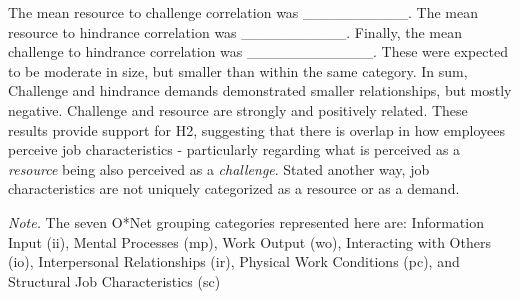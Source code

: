 \documentclass[
  english,
  man]{apa6}
\newenvironment{lltable}{\begin{landscape}\begin{center}\begin{ThreePartTable}}{\end{ThreePartTable}\end{center}\end{landscape}}
\begin{document}
The mean resource to challenge correlation was \_\_\_\_\_\_\_\_\_\_. The mean resource to hindrance correlation was \_\_\_\_\_\_\_\_\_\_. Finally, the mean challenge to hindrance correlation was \_\_\_\_\_\_\_\_\_\_\_\_. These were expected to be moderate in size, but smaller than within the same category. In sum, Challenge and hindrance demands demonstrated smaller relationships, but mostly negative. Challenge and resource are strongly and positively related. These results provide support for H2, suggesting that there is overlap in how employees perceive job characteristics - particularly regarding what is perceived as a \emph{resource} being also perceived as a \emph{challenge}. Stated another way, job characteristics are not uniquely categorized as a resource or as a demand.

\begin{lltable}

\begin{TableNotes}[para]
\normalsize{\textit{Note.} The seven O*Net grouping categories represented here are: Information Input (ii), Mental Processes (mp), Work Output (wo), Interacting with Others (io), Interpersonal Relationships (ir), Physical Work Conditions (pc), and Structural Job Characteristics (sc)}
\end{TableNotes}

\tiny{

}
\end{lltable}
\end{document}
